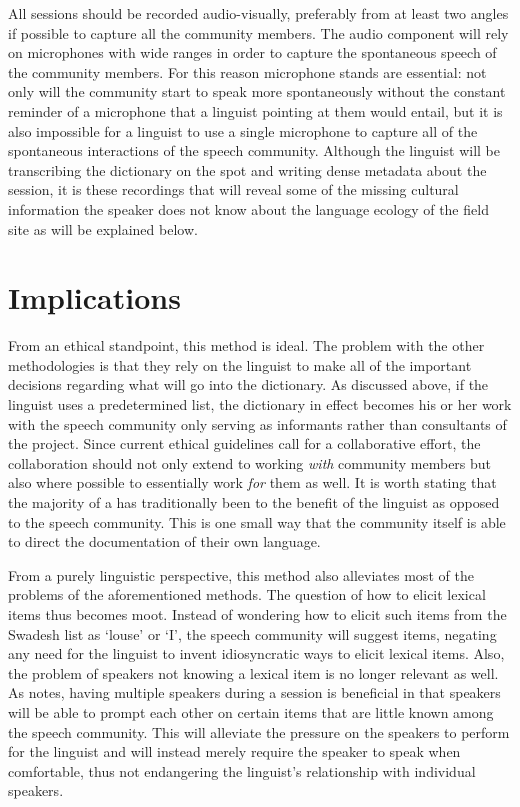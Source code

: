 \documentclass[output=paper,
modfonts
]{langscibook}
\begin{document}
All sessions should be recorded audio-visually, preferably from at least two angles if possible to capture all the community members. The audio component will rely on microphones with wide ranges in order to capture the spontaneous speech of the community members. For this reason microphone stands are essential:  not only will the community start to speak more spontaneously without the constant reminder of a microphone that a linguist pointing at them would entail, but it is also impossible for a linguist to use a single microphone to capture all of the spontaneous interactions of the speech community. Although the linguist will be transcribing the dictionary on the spot and writing dense metadata about the session, it is these recordings that will reveal some of the missing cultural information the speaker does not know about the language ecology of the field site as will be explained below. 

\section{Implications}

From an ethical standpoint, this method is ideal. The problem with the other methodologies is that they rely on the linguist to make all of the important decisions regarding what will go into the dictionary. As discussed above, if the linguist uses a predetermined list, the dictionary in effect becomes his or her work with the speech community only serving as informants rather than consultants of the project. Since current ethical guidelines call for a collaborative effort, the collaboration should not only extend to working \textit{with} community members but also where possible to essentially work \textit{for} them as well. It is worth stating that the majority of a  has traditionally been to the benefit of the linguist as opposed to the speech community. This is one small way that the community itself is able to direct the documentation of their own language. 

From a purely linguistic perspective, this method also alleviates most of the problems of the aforementioned methods. The question of how to elicit lexical items thus becomes moot. Instead of wondering how to elicit such items from the Swadesh list as ‘louse’ or ‘I’, the speech community will suggest items, negating any need for the linguist to invent idiosyncratic ways to elicit lexical items. Also, the problem of speakers not knowing a lexical item is no longer relevant as well. As \citet{Bowern2008} notes, having multiple speakers during a session is beneficial in that speakers will be able to prompt each other on certain items that are little known among the speech community. This will alleviate the pressure on the speakers to perform for the linguist and will instead merely require the speaker to speak when comfortable, thus not endangering the linguist’s relationship with individual speakers. 
\end{document}
